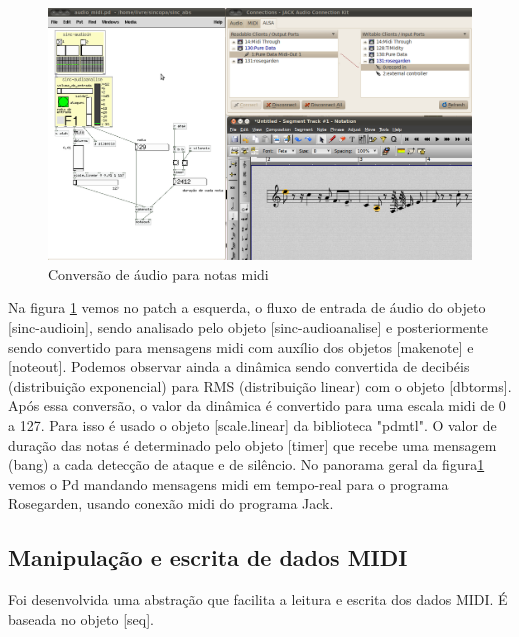 \documentclass[draft]{ppgmus}
\begin{document}
\begin{figure}
\includegraphics[scale=.5]{audio2midi}
\caption{Conversão de áudio para notas midi}
\label{audio2midi}
\end{figure}


Na figura \ref{audio2midi} vemos no patch a esquerda, o fluxo de entrada de áudio do objeto
[sinc-audioin], sendo analisado pelo objeto [sinc-audioanalise] e posteriormente
sendo convertido para mensagens midi com auxílio dos objetos [makenote] e [noteout].
Podemos observar ainda a dinâmica sendo convertida de decibéis (distribuição exponencial)
 para RMS (distribuição linear) com o objeto [dbtorms]. Após essa conversão,
o valor da dinâmica é convertido para uma escala midi de 0 a 127. Para isso é usado
o objeto [scale.linear] da biblioteca "pdmtl". O valor de duração das notas é determinado
pelo objeto [timer] que recebe uma mensagem (bang) a cada detecção de ataque e de silêncio.
No panorama geral da figura\ref{audio2midi} vemos o Pd mandando mensagens midi em tempo-real
para o programa Rosegarden, usando conexão midi do programa Jack. 


\subsection{Manipulação e escrita de dados MIDI}

% 




Foi desenvolvida uma abstração que facilita a leitura e escrita dos dados MIDI. É baseada no
objeto [seq].
\end{document}
